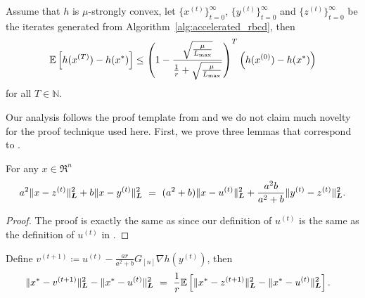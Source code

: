 \begin{theorem} \label{thm:accelerated_rbcd}
    Assume that $h$ is $\mu$-strongly convex, let $\{x^{(t)}\}_{t=0}^\infty$, $\{y^{(t)}\}_{t=0}^\infty$ and $\{z^{(t)}\}_{t=0}^\infty$ be the iterates generated from Algorithm~\ref{alg:accelerated_rbcd}, then
    \begin{align*}
        \mathbb{E} \left[ h( x^{(T)} ) - h(x^*) \right] \leq \left( 1 - \frac{ \sqrt{\frac{\mu}{L_{\max}}}}{ \frac{1}{r} + \sqrt{\frac{\mu}{L_{\max}}} } \right)^T \left( h(x^{(0)}) - h(x^*) \right)
    \end{align*}
    for all $T \in \mathbb{N}$.
\end{theorem}

Our analysis follows the proof template from \citet{Lu18} and we do not claim much novelty for the proof technique used here. First, we prove three lemmas that correspond to \citep[Lemma~A.1, Lemma~A.2, Lemma~A.3]{Lu18}.

\begin{lemma} \label{lemma:Lu18A1}
    For any $x\in\Re^n$
    \[a^2 \| x - z^{(t)} \|^2_{\boldsymbol{L}} + b  \| x - y^{(t)} \|^2_{\boldsymbol{L}} ~=~ (a^2 + b) \| x - u^{(t)} \|^2_{\boldsymbol{L}} + \frac{a^2b}{a^2+b} \| y^{(t)} - z^{(t)} \|^2_{\boldsymbol{L}}.\]
\end{lemma}
\begin{proof}
     The proof is exactly the same as \cite[Lemma~A.1]{Lu18} since our definition of $u^{(t)}$ is the same as the definition of $u^{(t)}$ in \cite[Algorithm~2]{Lu18}.
\end{proof}

\begin{lemma} \label{lemma:Lu18A2}
    Define $v^{(t+1)} \coloneqq u^{(t)} - \frac{ar}{a^2 + b} G_{[n]} \nabla h(y^{(t)})$, then
    \begin{align*}
        \| x^* - v^{(t+1)} \|^2_{\boldsymbol{L}} - \| x^* - u^{(t)} \|^2_{\boldsymbol{L}} &~=~ \frac{1}{r} \mathbb{E} \left[ \| x^* - z^{(t+1)} \|^2_{\boldsymbol{L}} - \| x^* - u^{(t)} \|^2_{\boldsymbol{L}} \right]. 
    \end{align*}
\end{lemma}


